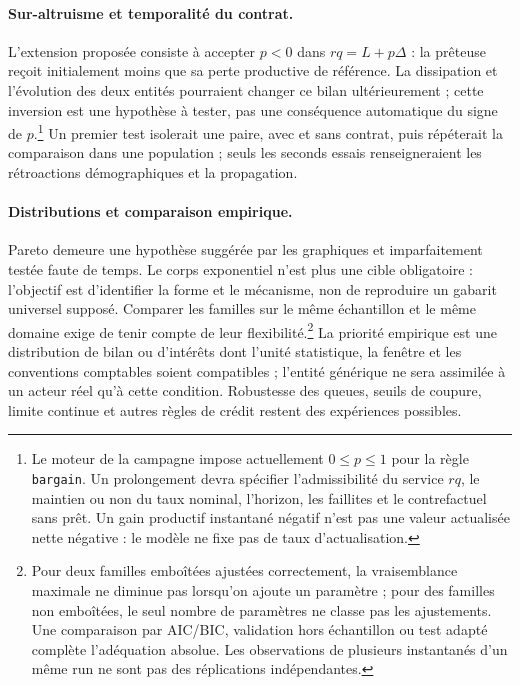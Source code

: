 \paragraph{Sur-altruisme et temporalité du contrat.}
L'extension proposée consiste à accepter $p<0$ dans $rq=L+p\Delta$ :
la prêteuse reçoit initialement moins que sa perte productive de référence.
La dissipation et l'évolution des deux entités pourraient changer ce bilan
ultérieurement ; cette inversion est une hypothèse à tester, pas une
conséquence automatique du signe de $p$.\footnote{Le moteur de la campagne
impose actuellement $0\leq p\leq1$ pour la règle \texttt{bargain}.
Un prolongement devra spécifier l'admissibilité du service $rq$, le maintien
ou non du taux nominal, l'horizon, les faillites et le contrefactuel sans prêt.
Un gain productif instantané négatif n'est pas une valeur actualisée nette
négative : le modèle ne fixe pas de taux d'actualisation.}
Un premier test isolerait une paire, avec et sans contrat, puis répéterait
la comparaison dans une population ; seuls les seconds essais renseigneraient
les rétroactions démographiques et la propagation.

\paragraph{Distributions et comparaison empirique.}
Pareto demeure une hypothèse suggérée par les graphiques et imparfaitement
testée faute de temps. Le corps exponentiel n'est plus une cible obligatoire :
l'objectif est d'identifier la forme et le mécanisme, non de reproduire un
gabarit universel supposé. Comparer les familles sur le même échantillon et le
même domaine exige de tenir compte de leur flexibilité.\footnote{Pour deux
familles emboîtées ajustées correctement, la vraisemblance maximale ne diminue
pas lorsqu'on ajoute un paramètre ; pour des familles non emboîtées, le seul
nombre de paramètres ne classe pas les ajustements. Une comparaison par
AIC/BIC, validation hors échantillon ou test adapté complète l'adéquation
absolue. Les observations de plusieurs instantanés d'un même run ne sont pas
des réplications indépendantes.}
La priorité empirique est une distribution de bilan ou d'intérêts dont
l'unité statistique, la fenêtre et les conventions comptables soient
compatibles ; l'entité générique ne sera assimilée à un acteur réel qu'à
cette condition. Robustesse des queues, seuils de coupure, limite continue
et autres règles de crédit restent des expériences possibles.
